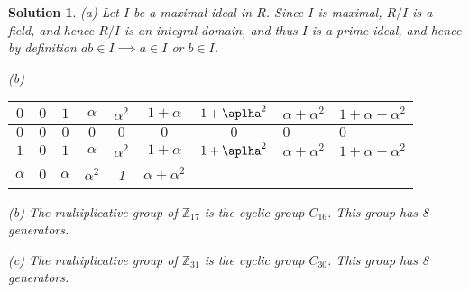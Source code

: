 \documentclass[12pt]{article}
\theoremstyle{moo}
\newtheorem*{sol}{Solution}
\def\zz{{\mathbb Z}}
\begin{document}
\begin{sol}
(a) Let $I$ be a maximal ideal in $R$. Since $I$ is maximal, $R/I$ is a field, and hence $R/I$ is an integral domain, and thus $I$ is a prime ideal, and hence by definition $ab \in I \implies a \in I$ or $b \in I$.


(b)

\begin{tabular}{|c|c|c|c|c|c|c|}

\hline
$0$ & $0$ & $1$ & $\alpha$ & $\alpha^2$ & $1 + \alpha$ & $1 + \aplha^2 $ & $\alpha + \alpha^2$ & $1 + \alpha + \alpha^2$ \\
\hline
$0$ & $0$ & $0$ & $0$ & $0$ & $0$ & $0$ & $0$ & $0$\\
\hline
$1$ & $0$ & $1$ & $\alpha$ & $\alpha^2$ & $1 + \alpha$ & $1 + \aplha^2 $ & $\alpha + \alpha^2$ & $1 + \alpha + \alpha^2$ \\
\hline
$\alpha$ & $0$ & $\alpha$ & $\alpha^2$ & 1 & $\alpha + \alpha^2$
\end{tabular}


(b) The multiplicative group of $\zz_{17}$ is the cyclic group $C_{16}$. This group has 8 generators.

(c) The multiplicative group of $\zz_{31}$ is the cyclic group $C_{30}$. This group has 8 generators.

\end{sol}
\end{document}
